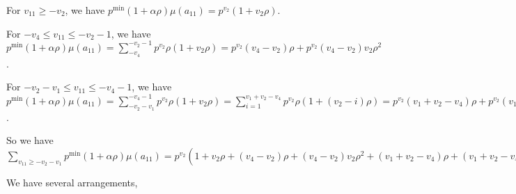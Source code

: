 \documentclass{article}
\begin{document}
For $v_{11}\geq{-v_2}$, we have $p^{\min}(1+\alpha\rho)\mu(a_{11})=p^{v_2}(1+v_2\rho)$.

For $-v_4\leq{v_{11}}\leq{-v_2-1}$, we have $p^{\min}(1+\alpha\rho)\mu(a_{11})=\sum_{-v_4}^{-v_2-1}p^{v_2}\rho(1+v_2\rho)=p^{v_2}(v_4-v_2)\rho+p^{v_2}(v_4-v_2)v_2\rho^2$.

For $-v_2-v_1\leq{v_{11}}\leq{-v_4-1}$, we have $p^{\min}(1+\alpha\rho)\mu(a_{11})=\sum_{-v_2-v_1}^{-v_4-1}p^{v_2}\rho(1+v_2\rho)=\sum_{i=1}^{v_1+v_2-v_
4}p^{v_2}\rho(1+(v_2-i)\rho)=p^{v_2}(v_1+v_2-v_4)\rho+p^{v_2}(v_1+v_2-v_4)v_2\rho^2-p^{v_2}\binom{v_1+v_2-v_4+1}{2}\rho^2$.

So we have $\sum_{v_{11}\geq{-v_2-v_1}}p^{\min}(1+\alpha\rho)\mu(a_{11})=p^{v_2}(1+v_2\rho+(v_4-v_2)\rho+(v_4-v_2)v_2\rho^2+(v_1+v_2-v_4)\rho+(v_1+v_2-v_4)v_2\rho^2-\frac{(v_1+v_2-v_4+1)(v_1+v_2-v_4)}{2}\rho^2)$

We have several arrangements,
\end{document}
